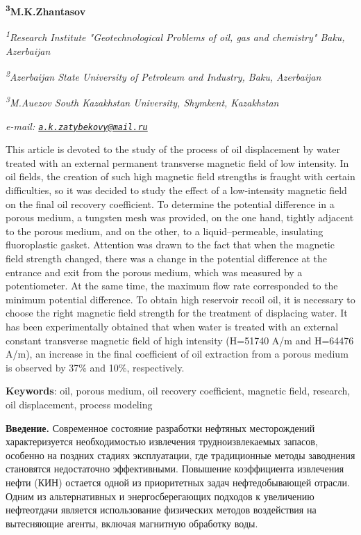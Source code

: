{{{\bfseries \textsuperscript{3}M.K.Zhantasov}

\emph{\textsuperscript{1}Research Institute "Geotechnological Problems
of oil, gas and chemistry" Baku, Azerbaijan}

\emph{\textsuperscript{2}Azerbaijan State University of Petroleum and
Industry, Baku, Azerbaijan}

\emph{\textsuperscript{3}M.Auezov South Kazakhstan University, Shymkent,
Kazakhstan}

\emph{e-mail:
\href{mailto:a.k.zatybekovy@mail.ru}{\nolinkurl{a.k.zatybekovy@mail.ru}}}

This article is devoted to the study of the process of oil displacement
by water treated with an external permanent transverse magnetic field of
low intensity. In oil fields, the creation of such high magnetic field
strengths is fraught with certain difficulties, so it was decided to
study the effect of a low-intensity magnetic field on the final oil
recovery coefficient. To determine the potential difference in a porous
medium, a tungsten mesh was provided, on the one hand, tightly adjacent
to the porous medium, and on the other, to a liquid--permeable,
insulating fluoroplastic gasket. Attention was drawn to the fact that
when the magnetic field strength changed, there was a change in the
potential difference at the entrance and exit from the porous medium,
which was measured by a potentiometer. At the same time, the maximum
flow rate corresponded to the minimum potential difference. To obtain
high reservoir recoil oil, it is necessary to choose the right magnetic
field strength for the treatment of displacing water. It has been
experimentally obtained that when water is treated with an external
constant transverse magnetic field of high intensity (H=51740 A/m and
H=64476 A/m), an increase in the final coefficient of oil extraction
from a porous medium is observed by 37\% and 10\%, respectively.

{\bfseries Keywords}: oil, porous medium, oil recovery coefficient,
magnetic field, research, oil displacement, process modeling

{\bfseries Введение.} Современное состояние разработки нефтяных
месторождений характеризуется необходимостью извлечения
трудноизвлекаемых запасов, особенно на поздних стадиях эксплуатации, где
традиционные методы заводнения становятся недостаточно эффективными.
Повышение коэффициента извлечения нефти (КИН) остается одной из
приоритетных задач нефтедобывающей отрасли. Одним из альтернативных и
энергосберегающих подходов к увеличению нефтеотдачи является
использование физических методов воздействия на вытесняющие агенты,
включая магнитную обработку воды.

}}

